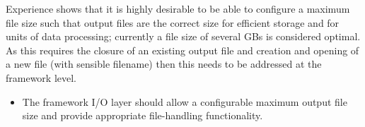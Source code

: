 \documentclass[../main-v1.tex]{subfiles}
\begin{document}
Experience shows that it is highly desirable to be able to configure a maximum file size such that output files are the correct size for efficient storage and for units of data processing; currently a file size of several GBs is considered optimal.  As this requires the closure of an existing output file and creation and opening of a new file (with sensible filename) then this needs to be addressed at the framework level.

\begin{itemize}
\item The framework I/O layer should allow a configurable maximum output file size and provide appropriate file-handling functionality.
\end{itemize}




\end{document}
